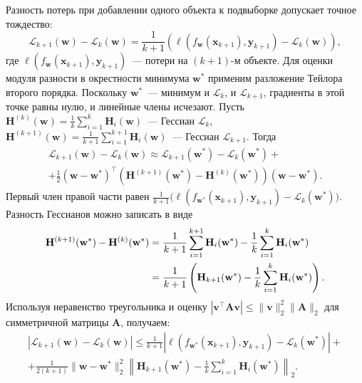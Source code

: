 Разность потерь при добавлении одного объекта к подвыборке допускает точное тождество:
\begin{equation}
\label{eq:loss-difference-exact}
\mathcal{L}_{k+1}(\mathbf{w}) - \mathcal{L}_k(\mathbf{w}) = \frac{1}{k+1}\left( \ell(f_{\mathbf{w}}(\mathbf{x}_{k+1}), \mathbf{y}_{k+1}) - \mathcal{L}_k(\mathbf{w}) \right),
\end{equation}
где $\ell(f_{\mathbf{w}}(\mathbf{x}_{k+1}), \mathbf{y}_{k+1})$~--- потери на $(k+1)$-м объекте. Для оценки модуля разности в окрестности минимума $\mathbf{w}^*$ применим разложение Тейлора второго порядка. Поскольку $\mathbf{w}^*$~--- минимум и $\mathcal{L}_k$, и $\mathcal{L}_{k+1}$, градиенты в этой точке равны нулю, и линейные члены исчезают. Пусть $\mathbf{H}^{(k)}(\mathbf{w}) = \frac{1}{k}\sum_{i=1}^k \mathbf{H}_i(\mathbf{w})$~--- Гессиан $\mathcal{L}_k$, $\mathbf{H}^{(k+1)}(\mathbf{w}) = \frac{1}{k+1}\sum_{i=1}^{k+1} \mathbf{H}_i(\mathbf{w})$~--- Гессиан $\mathcal{L}_{k+1}$. Тогда
\begin{multline}
\label{eq:taylor-diff}
\mathcal{L}_{k+1}(\mathbf{w}) - \mathcal{L}_k(\mathbf{w}) \approx \mathcal{L}_{k+1}(\mathbf{w}^*) - \mathcal{L}_k(\mathbf{w}^*) + \\ + \frac{1}{2}(\mathbf{w}-\mathbf{w}^*)^\top \left( \mathbf{H}^{(k+1)}(\mathbf{w}^*) - \mathbf{H}^{(k)}(\mathbf{w}^*) \right) (\mathbf{w}-\mathbf{w}^*).
\end{multline}
Первый член правой части равен $\frac{1}{k+1}\bigl( \ell(f_{\mathbf{w}^*}(\mathbf{x}_{k+1}), \mathbf{y}_{k+1}) - \mathcal{L}_k(\mathbf{w}^*) \bigr)$. Разность Гессианов можно записать в виде
\begin{align}
    \mathbf{H}^{(k+1)}(\mathbf{w}^*) - \mathbf{H}^{(k)}(\mathbf{w}^*)
    &= \frac{1}{k+1}\sum_{i=1}^{k+1}\mathbf{H}_i(\mathbf{w}^*) - \frac{1}{k}\sum_{i=1}^{k}\mathbf{H}_i(\mathbf{w}^*) \notag \\
    &= \frac{1}{k+1}\left( \mathbf{H}_{k+1}(\mathbf{w}^*) - \frac{1}{k}\sum_{i=1}^{k}\mathbf{H}_i(\mathbf{w}^*) \right).
\end{align}
Используя неравенство треугольника и оценку $|\mathbf{v}^\top \mathbf{A} \mathbf{v}| \leqslant \|\mathbf{v}\|_2^2 \|\mathbf{A}\|_2$ для симметричной матрицы $\mathbf{A}$, получаем:
\begin{multline}
\label{eq:loss-difference-bound}
\left|\mathcal{L}_{k+1}(\mathbf{w}) - \mathcal{L}_k(\mathbf{w})\right| \leqslant \frac{1}{k+1}\left|\ell(f_{\mathbf{w}^*}(\mathbf{x}_{k+1}), \mathbf{y}_{k+1}) - \mathcal{L}_k(\mathbf{w}^*)\right| + \\
+ \frac{1}{2(k+1)}\|\mathbf{w} - \mathbf{w}^*\|_2^2 \left\|\mathbf{H}_{k+1}(\mathbf{w}^*) - \frac{1}{k}\sum_{i=1}^k \mathbf{H}_i(\mathbf{w}^*)\right\|_2.
\end{multline}

